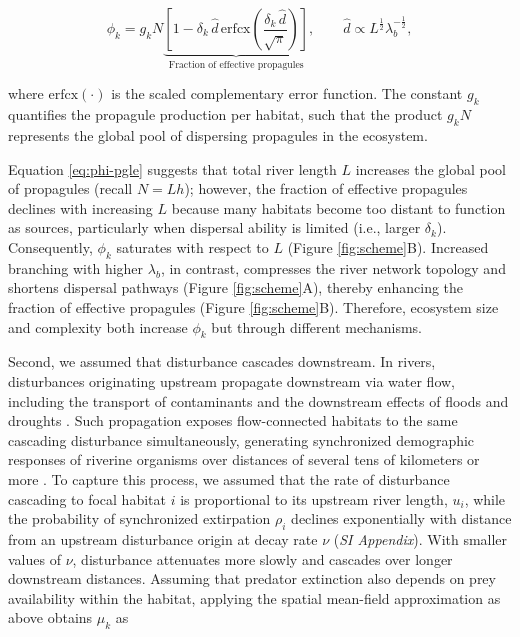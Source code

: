 \documentclass[11pt, class=article, crop=false]{standalone}
\theoremstyle{definition}
\begin{document}
\begin{equation}
    \phi_k
    = 
    g_k N 
    \underbrace{
    \left[
        1 - \delta_k\,\hat{d}\,\mathrm{erfcx}
        \left(
            \frac{\delta_k\,\hat{d}}{\sqrt{\pi}}
        \right) 
    \right]
    }_{\text{Fraction of effective propagules}},
    \qquad
    \hat{d} 
    \propto 
    L^{\frac{1}{2}} \lambda_b^{-\frac{1}{2}},
\label{eq:phi-pgle}
\end{equation}

where $\mathrm{erfcx}(\cdot)$ is the scaled complementary error function.
The constant $g_k$ quantifies the propagule production per habitat, such that the product $g_k N$ represents the global pool of dispersing propagules in the ecosystem.

Equation \ref{eq:phi-pgle} suggests that total river length $L$ increases the global pool of propagules (recall $N = Lh$); however, the fraction of effective propagules declines with increasing $L$ because many habitats become too distant to function as sources, particularly when dispersal ability is limited (i.e., larger $\delta_k$).
Consequently, $\phi_k$ saturates with respect to $L$ (Figure \ref{fig:scheme}B).
Increased branching with higher $\lambda_b$, in contrast, compresses the river network topology and shortens dispersal pathways (Figure \ref{fig:scheme}A), thereby enhancing the fraction of effective propagules (Figure \ref{fig:scheme}B).
Therefore, ecosystem size and complexity both increase $\phi_k$ but through different mechanisms.

Second, we assumed that disturbance cascades downstream. 
In rivers, disturbances originating upstream propagate downstream via water flow, including the transport of contaminants and the downstream effects of floods and droughts \citep{massoudieh_biogeochemical_2010, stanley_ecosystem_1997, swanson_flood_1998, nakamura_disturbance_2000, gomi_understanding_2002, messager_global_2021}.
Such propagation exposes flow-connected habitats to the same cascading disturbance simultaneously, generating synchronized demographic responses of riverine organisms over distances of several tens of kilometers or more \citep{larsen_geography_2021, sarremejane_drought_2021, tamario_barriers_2025, terui_metapopulation_2018}. 
To capture this process, we assumed that the rate of disturbance cascading to focal habitat $i$ is proportional to its upstream river length, $u_i$, while the probability of synchronized extirpation $\rho_i$ declines exponentially with distance from an upstream disturbance origin at decay rate $\nu$ (\textit{SI Appendix}).
With smaller values of $\nu$, disturbance attenuates more slowly and cascades over longer downstream distances.
Assuming that predator extinction also depends on prey availability within the habitat, applying the spatial mean-field approximation as above obtains $\mu_k$ as
\end{document}
